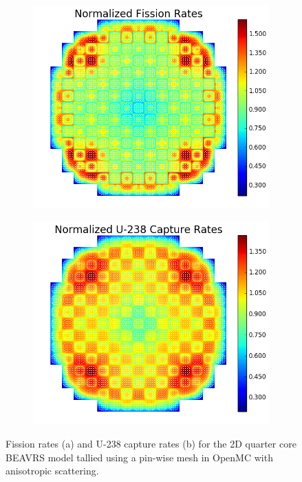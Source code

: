\begin{appendices}
\begin{figure}[h!]
\begin{subfigure}{\textwidth}
  \centering
  \includegraphics[width=0.75\linewidth]{figures/benchmarks/fission-rates/fiss-mean-full-core-aniso}
  \caption{}
  \label{fig:benchmarks-beavrs-fiss-aniso}
\end{subfigure}
\begin{subfigure}{\textwidth}
  \centering
  \includegraphics[width=0.75\linewidth]{figures/benchmarks/capture-rates/capt-mean-full-core-aniso}
  \caption{}
  \label{fig:benchmarks-beavrs-capt-aniso}
\end{subfigure}
\vspace{2mm}
\caption[BEAVRS reaction rates with anisotropic scattering]{Fission rates (a) and U-238 capture rates (b) for the 2D quarter core \ac{BEAVRS} model tallied using a pin-wise mesh in OpenMC with anisotropic scattering.}
\label{fig:benchmarks-beavrs-aniso}
\end{figure}
	


\end{appendices}
